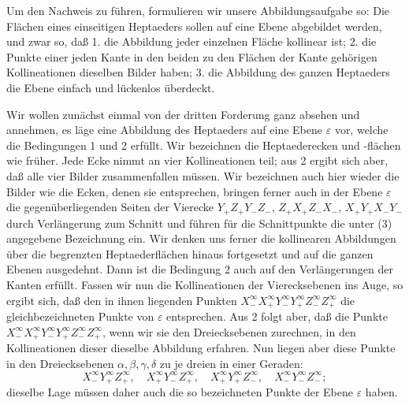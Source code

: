 \documentclass[11pt,a4paper]{article}
\begin{document}
Um den Nachweis zu f\"uhren, formulieren wir unsere Abbildungsaufgabe so: Die Fl\"achen eines einseitigen Heptaeders sollen auf eine Ebene abgebildet werden, und zwar so, da\ss{} 1. die Abbildung jeder einzelnen Fl\"ache kollinear ist; 2. die Punkte einer jeden Kante in den beiden zu den Fl\"achen der Kante geh\"origen Kollineationen dieselben Bilder haben; 3. die Abbildung des ganzen Heptaeders die Ebene einfach und l\"uckenlos \"uberdeckt.

Wir wollen zun\"achst einmal von der dritten Forderung ganz absehen und annehmen, es l\"age eine Abbildung des Heptaeders auf eine Ebene $\varepsilon$ vor, welche die Bedingungen 1 und 2 erf\"ullt. Wir bezeichnen die Heptaederecken und -fl\"achen wie fr\"uher. Jede Ecke nimmt an vier Kollineationen teil; aus 2 ergibt sich aber, da\ss{} alle vier Bilder zusammenfallen m\"ussen. Wir bezeichnen auch hier wieder die Bilder wie die Ecken, denen sie entsprechen, bringen ferner auch in der Ebene $\varepsilon$ die gegen\"uberliegenden Seiten der Vierecke $Y_+Z_+Y_-Z_-$, $Z_+X_+Z_-X_-$, $X_+Y_+X_-Y_-$ durch Verl\"angerung zum Schnitt und f\"uhren f\"ur die Schnittpunkte die unter (3) angegebene Bezeichnung ein. Wir denken uns ferner die kollinearen Abbildungen \"uber die begrenzten Heptaederfl\"achen hinaus fortgesetzt und auf die ganzen Ebenen ausgedehnt. Dann ist die Bedingung 2 auch auf den Verl\"angerungen der Kanten erf\"ullt. Fassen wir nun die Kollineationen der Vierecksebenen ins Auge, so ergibt sich, da\ss{} den in ihnen liegenden Punkten $X_-^\infty X_+^\infty Y_-^\infty Y_+^\infty Z_-^\infty Z_+^\infty$ die gleichbezeichneten Punkte von $\varepsilon$ entsprechen. Aus 2 folgt aber, da\ss{} die Punkte $X_-^\infty X_+^\infty Y_-^\infty Y_+^\infty Z_-^\infty Z_+^\infty$, wenn wir sie den Dreiecksebenen zurechnen, in den Kollineationen dieser dieselbe Abbildung erfahren. Nun liegen aber diese Punkte in den Dreiecksebenen $\alpha,\beta,\gamma,\delta$ zu je dreien in einer Geraden:
\[
 X_-^\infty Y_+^\infty Z_+^\infty,
 \quad X_+^\infty Y_-^\infty Z_+^\infty,
 \quad X_+^\infty Y_+^\infty Z_-^\infty,
 \quad X_-^\infty Y_-^\infty Z_-^\infty;
\]
dieselbe Lage m\"ussen daher auch die so bezeichneten Punkte der Ebene $\varepsilon$ haben.
\end{document}
